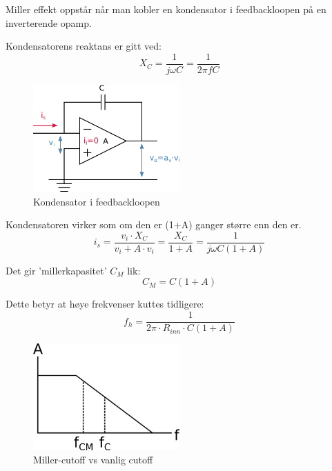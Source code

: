 Miller effekt oppstår når man kobler en kondensator i feedbackloopen på en
inverterende opamp.

Kondensatorens reaktans er gitt ved:
$$X_C = \frac{1}{j\omega C} = \frac{1}{2\pi fC}$$

\begin{figure}[H]
  \caption{Kondensator i feedbackloopen}
  \centering
  \includegraphics[width=0.5\textwidth]{./img/miller}
\end{figure}

Kondensatoren virker som om den er (1+A) ganger større enn den er.
$$i_s = \frac{v_i\cdot X_C}{v_i + A\cdot v_i}
      = \frac{X_C}{1 + A}
      = \frac{1}{j\omega C(1+A)}$$

Det gir 'millerkapasitet' $C_M$ lik:
$$C_M = C(1+A)$$

Dette betyr at høye frekvenser kuttes tidligere:
$$f_h = \frac{1}{2\pi \cdot R_{inn} \cdot C(1+A)}$$

\begin{figure}[H]
  \caption{Miller-cutoff vs vanlig cutoff}
  \centering
  \includegraphics[width=0.5\textwidth]{./img/millercutoff}
\end{figure}

